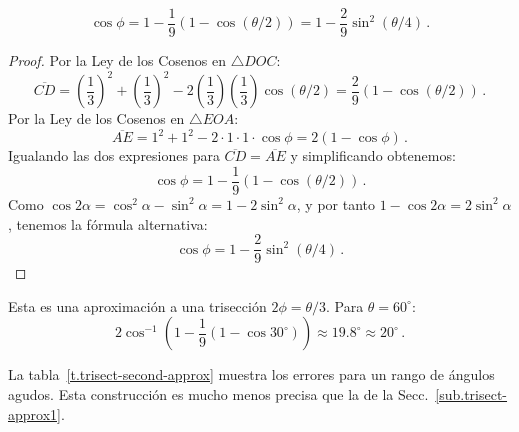 \begin{theorem}
\[
\cos\phi=1 - \frac{1}{9}(1-\cos(\theta/2))=1 - \frac{2}{9}\sin^2(\theta/4)\,.
\]
\end{theorem}
\begin{proof} Por la Ley de los Cosenos en $\triangle DOC$:
\[
\overline{CD}= \left(\frac{1}{3}\right)^2+\left(\frac{1}{3}\right)^2-2\left(\frac{1}{3}\right)\left(\frac{1}{3}\right)\cos (\theta/2)=\frac{2}{9}(1-\cos(\theta/2))\,.
\]
Por la Ley de los Cosenos en $\triangle EOA$:
\[
\overline{AE} = 1^2+1^2-2\cdot 1\cdot 1\cdot \cos \phi=2(1-\cos \phi)\,.
\]
Igualando las dos expresiones para $\overline{CD}=\overline{AE}$ y simplificando obtenemos:
\[
\cos \phi = 1 - \frac{1}{9}(1-\cos(\theta/2))\,.
\]
Como $\cos 2\alpha= \cos^2 \alpha-\sin^2\alpha=1-2\sin^2\alpha$, y por tanto $1-\cos 2\alpha=2\sin^2\alpha$, tenemos la fórmula alternativa:
\[
\cos \phi = 1 - \frac{2}{9}\sin^2(\theta/4)\,.
\]
\end{proof}

Esta es una aproximación a una trisección $2\phi=\theta/3$. Para $\theta=60^\circ$:
\[
2\cos^{-1}\left(1 - \frac{1}{9}(1-\cos 30^\circ)\right)\approx 19.8^\circ\approx 20^\circ\,.
\]

La tabla~\ref{t.trisect-second-approx} muestra los errores para un rango de ángulos agudos. Esta construcción es mucho menos precisa que la de la Secc.~\ref{sub.trisect-approx1}.

